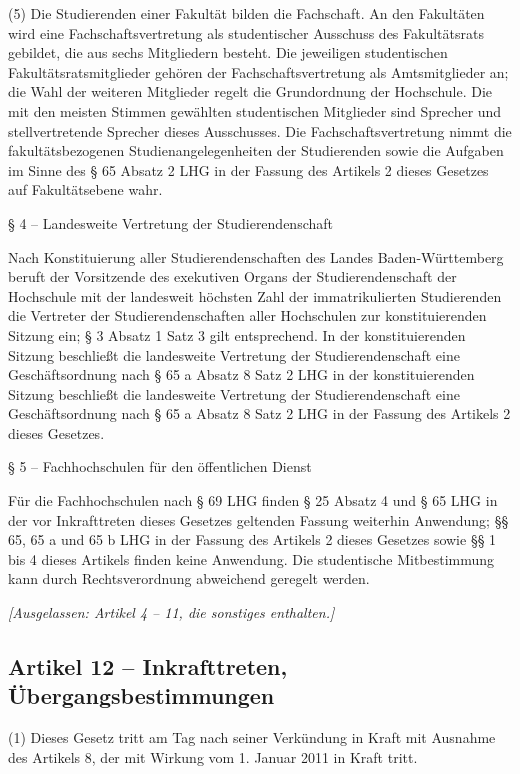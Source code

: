 \documentclass[
10pt,
a4paper,
twoside,								%
titlepage=false,							%
draft=false								%
]{scrartcl}
\begin{document}
(5) Die Studierenden einer Fakultät bilden die Fachschaft. An den Fakultäten wird eine Fachschaftsvertretung als studentischer Ausschuss des Fakultätsrats gebildet, die aus sechs Mitgliedern besteht. Die jeweiligen studentischen Fakultätsratsmitglieder gehören der Fachschaftsvertretung als Amtsmitglieder an; die Wahl der weiteren Mitglieder regelt die Grundordnung der Hochschule. Die mit den meisten Stimmen gewählten studentischen Mitglieder sind Sprecher und stellvertretende Sprecher dieses Ausschusses. Die Fachschaftsvertretung nimmt die fakultätsbezogenen Studienangelegenheiten der Studierenden sowie die Aufgaben im Sinne des § 65 Absatz 2 LHG in der Fassung des Artikels 2 dieses Gesetzes auf Fakultätsebene wahr.


§ 4 – Landesweite Vertretung der Studierendenschaft

Nach Konstituierung aller Studierendenschaften des Landes Baden-Württemberg beruft der Vorsitzende des exekutiven Organs der Studierendenschaft der Hochschule mit der landesweit höchsten Zahl der immatrikulierten Studierenden die Vertreter der Studierendenschaften aller Hochschulen zur konstituierenden Sitzung ein; § 3 Absatz 1 Satz 3 gilt entsprechend. In der konstituierenden Sitzung beschließt die landesweite Vertretung der Studierendenschaft eine Geschäftsordnung nach § 65 a Absatz 8 Satz 2 LHG in der konstituierenden Sitzung beschließt die landesweite Vertretung der Studierendenschaft eine Geschäftsordnung nach § 65 a Absatz 8 Satz 2 LHG in der Fassung des Artikels 2 dieses Gesetzes.


§ 5 – Fachhochschulen für den öffentlichen Dienst

Für die Fachhochschulen nach § 69 LHG finden § 25 Absatz 4 und § 65 LHG in der vor Inkrafttreten dieses Gesetzes geltenden Fassung weiterhin Anwendung; §§ 65, 65 a und 65 b LHG in der Fassung des Artikels 2 dieses Gesetzes sowie §§ 1 bis 4 dieses Artikels finden keine Anwendung. Die studentische Mitbestimmung kann durch Rechtsverordnung abweichend geregelt werden.


\bigskip
\emph{[Ausgelassen: Artikel 4 – 11, die sonstiges enthalten.]}


\subsection{Artikel 12 – Inkrafttreten, Übergangsbestimmungen}

(1) Dieses Gesetz tritt am Tag nach seiner Verkündung in Kraft mit Ausnahme des Artikels 8, der mit Wirkung vom 1. Januar 2011 in Kraft tritt.
\end{document}
